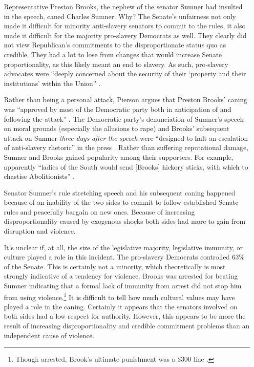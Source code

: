 \documentclass[a4paper]{article}\usepackage[]{graphicx}\usepackage[]{color}
\begin{document}
Representative Preston Brooks, the nephew of the senator Sumner had insulted in the speech, caned Charles Sumner. Why? The Senate's unfairness not only made it difficult for minority anti-slavery senators to commit to the rules, it also made it difficult for the majority pro-slavery Democrats as well. They clearly did not view Republican's commitments to the disproportionate status quo as credible. They had a lot to lose from changes that would increase Senate proportionality, as this likely meant an end to slavery. As such, pro-slavery advocates were ``deeply concerned about the security of their `property and their institutions' within the Union'' \cite[281]{Mittal2013}.

Rather than being a personal attack, Pierson argues that Preston Brooks' caning was ``approved by most of the Democratic party both in anticipation of and following the attack'' \cite[553]{Pierson1995}. The Democratic party's denunciation of Sumner's speech on moral grounds (especially the allusions to rape) and Brooks' subsequent attack on Sumner \emph{three days after the speech} were ``designed to halt an escalation of anti-slavery rhetoric'' in the press \cite[553]{Pierson1995}. Rather than suffering reputational damage, Sumner and Brooks gained popularity among their supporters. For example, apparently ``ladies of the South would send [Brooks] hickory sticks, with which to chastise Abolitionists'' \cite[255]{Donald2009}.

Senator Sumner's rule stretching speech and his subsequent caning happened because of an inability of the two sides to commit to follow established Senate rules and peacefully bargain on new ones. Because of increasing disproportionality caused by exogenous shocks both sides had more to gain from disruption and violence.

It's unclear if, at all, the size of the legislative majority, legislative immunity, or culture played a role in this incident. The pro-slavery Democrats controlled 63\% of the Senate. This is certainly not a minority, which theoretically is most strongly indicative of a tendency for violence. Brooks was arrested for beating Sumner indicating that a formal lack of immunity from arrest did not stop him from using violence.\footnote{Though arrested, Brook's ultimate punishment was a \$300 fine \cite[59]{Wolfe2004}.} It is difficult to tell how much cultural values may have played a role in the caning. Certainly it appears that the senators involved on both sides had a low respect for authority. However, this appears to be more the result of increasing disproportionality and credible commitment problems than an independent cause of violence.
\end{document}
